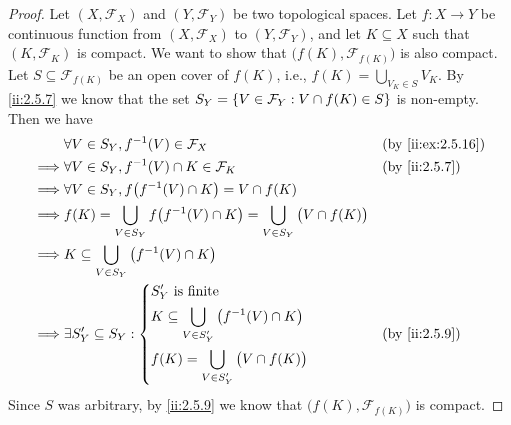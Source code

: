 \begin{proof}
  Let \((X, \mathcal{F}_X)\) and \((Y, \mathcal{F}_Y)\) be two topological spaces.
  Let \(f : X \to Y\) be continuous function from \((X, \mathcal{F}_X)\) to \((Y, \mathcal{F}_Y)\), and let \(K \subseteq X\) such that \((K, \mathcal{F}_K)\) is compact.
  We want to show that \(\big(f(K), \mathcal{F}_{f(K)}\big)\) is also compact.
  Let \(S \subseteq \mathcal{F}_{f(K)}\) be an open cover of \(f(K)\), i.e., \(f(K) = \bigcup_{V_K \in S} V_K\).
  By \cref{ii:2.5.7} we know that the set \(S_Y = \left\lbrace V \in \mathcal{F}_Y : V \cap f(K) \in S\right\rbrace\) is non-empty.
  Then we have
  \begin{align*}
             & \forall V \in S_Y, f^{-1}(V) \in \mathcal{F}_X                                                     &  & \by{ii:ex:2.5.16} \\
    \implies & \forall V \in S_Y, f^{-1}(V) \cap K \in \mathcal{F}_K                                              &  & \by{ii:2.5.7}     \\
    \implies & \forall V \in S_Y, f\big(f^{-1}(V) \cap K\big) = V \cap f(K)                                                              \\
    \implies & f(K) = \bigcup_{V \in S_Y} f\big(f^{-1}(V) \cap K\big) = \bigcup_{V \in S_Y} \big(V \cap f(K)\big)                        \\
    \implies & K \subseteq \bigcup_{V \in S_Y} \big(f^{-1}(V) \cap K\big)                                                                \\
    \implies & \exists S_Y' \subseteq S_Y : \begin{dcases}
                                              S_Y' \text{ is finite}                                      \\
                                              K \subseteq \bigcup_{V \in S_Y'} \big(f^{-1}(V) \cap K\big) \\
                                              f(K) = \bigcup_{V \in S_Y'} \big(V \cap f(K)\big)
                                            \end{dcases}                                     &  & \by{ii:2.5.9}                          \\
  \end{align*}
  Since \(S\) was arbitrary, by \cref{ii:2.5.9} we know that \(\big(f(K), \mathcal{F}_{f(K)}\big)\) is compact.


\end{proof}
